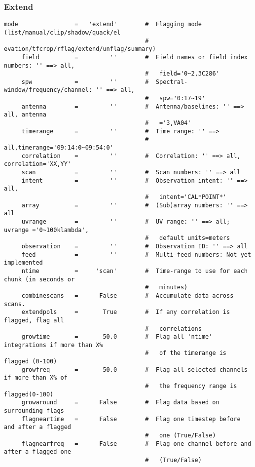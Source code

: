 \subsubsection{Extend}
\label{section:edit.flagdata.mode.extend}

\small
\begin{verbatim}
mode                =   'extend'        #  Flagging mode (list/manual/clip/shadow/quack/el
                                        #   evation/tfcrop/rflag/extend/unflag/summary)
     field          =         ''        #  Field names or field index numbers: '' ==> all,
                                        #   field='0~2,3C286'
     spw            =         ''        #  Spectral-window/frequency/channel: '' ==> all,
                                        #   spw='0:17~19'
     antenna        =         ''        #  Antenna/baselines: '' ==> all, antenna
                                        #   ='3,VA04'
     timerange      =         ''        #  Time range: '' ==>
                                        #   all,timerange='09:14:0~09:54:0'
     correlation    =         ''        #  Correlation: '' ==> all, correlation='XX,YY'
     scan           =         ''        #  Scan numbers: '' ==> all
     intent         =         ''        #  Observation intent: '' ==> all,
                                        #   intent='CAL*POINT*'
     array          =         ''        #  (Sub)array numbers: '' ==> all
     uvrange        =         ''        #  UV range: '' ==> all; uvrange ='0~100klambda',
                                        #   default units=meters
     observation    =         ''        #  Observation ID: '' ==> all
     feed           =         ''        #  Multi-feed numbers: Not yet implemented
     ntime          =     'scan'        #  Time-range to use for each chunk (in seconds or
                                        #   minutes)
     combinescans   =      False        #  Accumulate data across scans.
     extendpols     =       True        #  If any correlation is flagged, flag all
                                        #   correlations
     growtime       =       50.0        #  Flag all 'ntime' integrations if more than X%
                                        #   of the timerange is flagged (0-100)
     growfreq       =       50.0        #  Flag all selected channels if more than X% of
                                        #   the frequency range is flagged(0-100)
     growaround     =      False        #  Flag data based on surrounding flags
     flagneartime   =      False        #  Flag one timestep before and after a flagged
                                        #   one (True/False)
     flagnearfreq   =      False        #  Flag one channel before and after a flagged one
                                        #   (True/False)
\end{verbatim}
\normalsize

